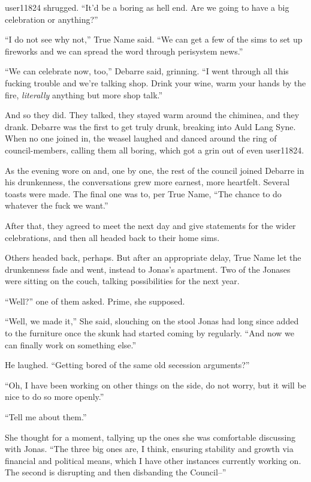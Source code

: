 user11824 shrugged. ``It'd be a boring as hell end. Are we going to have a big celebration or anything?''

``I do not see why not,'' True Name said. ``We can get a few of the sims to set up fireworks and we can spread the word through perisystem news.''

``We can celebrate now, too,'' Debarre said, grinning. ``I went through all this fucking trouble and we're talking shop. Drink your wine, warm your hands by the fire, \emph{literally} anything but more shop talk.''

And so they did. They talked, they stayed warm around the chiminea, and they drank. Debarre was the first to get truly drunk, breaking into Auld Lang Syne. When no one joined in, the weasel laughed and danced around the ring of council-members, calling them all boring, which got a grin out of even user11824.

As the evening wore on and, one by one, the rest of the council joined Debarre in his drunkenness, the conversations grew more earnest, more heartfelt. Several toasts were made. The final one was to, per True Name, ``The chance to do whatever the fuck we want.''

After that, they agreed to meet the next day and give statements for the wider celebrations, and then all headed back to their home sims.

Others headed back, perhaps. But after an appropriate delay, True Name let the drunkenness fade and went, instead to Jonas's apartment. Two of the Jonases were sitting on the couch, talking possibilities for the next year.

``Well?'' one of them asked. Prime, she supposed.

``Well, we made it,'' She said, slouching on the stool Jonas had long since added to the furniture once the skunk had started coming by regularly. ``And now we can finally work on something else.''

He laughed. ``Getting bored of the same old secession arguments?''

``Oh, I have been working on other things on the side, do not worry, but it will be nice to do so more openly.''

``Tell me about them.''

She thought for a moment, tallying up the ones she was comfortable discussing with Jonas. ``The three big ones are, I think, ensuring stability and growth via financial and political means, which I have other instances currently working on. The second is disrupting and then disbanding the Council--''

